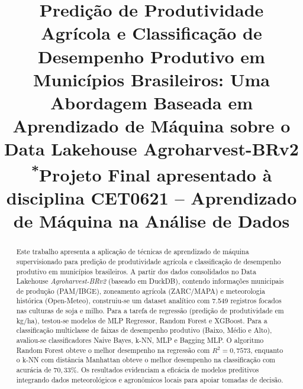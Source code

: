 \documentclass[conference]{IEEEtran}
\begin{document}
\title{Predição de Produtividade Agrícola e Classificação de Desempenho Produtivo em Municípios Brasileiros: Uma Abordagem Baseada em Aprendizado de Máquina sobre o Data Lakehouse Agroharvest-BRv2\\
{\footnotesize \textsuperscript{*}Projeto Final apresentado à disciplina CET0621 -- Aprendizado de Máquina na Análise de Dados}}

\author{
  \and
  \and
  \and
}

\maketitle

\begin{abstract}
Este trabalho apresenta a aplicação de técnicas de aprendizado de máquina supervisionado para predição de produtividade agrícola e classificação de desempenho produtivo em municípios brasileiros. A partir dos dados consolidados no Data Lakehouse \textit{Agroharvest-BRv2} (baseado em DuckDB), contendo informações municipais de produção (PAM/IBGE), zoneamento agrícola (ZARC/MAPA) e meteorologia histórica (Open-Meteo), construiu-se um dataset analítico com 7.549 registros focados nas culturas de soja e milho. Para a tarefa de regressão (predição de produtividade em kg/ha), testou-se modelos de MLP Regressor, Random Forest e XGBoost. Para a classificação multiclasse de faixas de desempenho produtivo (Baixo, Médio e Alto), avaliou-se classificadores Naive Bayes, k-NN, MLP e Bagging MLP. O algoritmo Random Forest obteve o melhor desempenho na regressão com $R^2 = 0{,}7573$, enquanto o k-NN com distância Manhattan obteve o melhor desempenho na classificação com acurácia de $70{,}33\%$. Os resultados evidenciam a eficácia de modelos preditivos integrando dados meteorológicos e agronômicos locais para apoiar tomadas de decisão.
\end{abstract}
\end{document}

